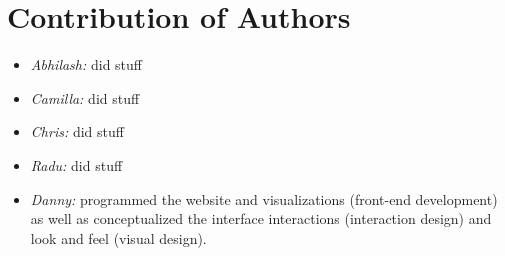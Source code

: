 \section{Contribution of Authors}

\begin{itemize}
\item \textit{Abhilash:} did stuff
\item \textit{Camilla:} did stuff
\item \textit{Chris:} did stuff
\item \textit{Radu:} did stuff
\item \textit{Danny:} programmed the website and visualizations (front-end development) as well as conceptualized the interface interactions (interaction design) and look and feel (visual design).
\end{itemize}